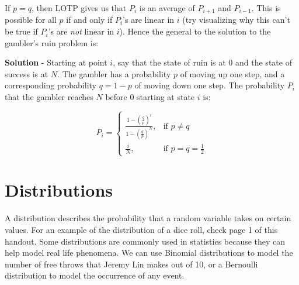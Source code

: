 \documentclass[11pt]{article}
\theoremstyle{definition}
\theoremstyle{remark}
\begin{document}
If $p = q$, then LOTP gives us that $P_i$ is an average of $P_{i+1}$ and $P_{i-1}$. This is possible for all $p$ if and only if $P_i$'s are linear in $i$ (try visualizing why this can't be true if $P_i$'s are \textit{not} linear in $i$). Hence the general to the solution to the gambler's ruin problem is:

\textbf{Solution} - Starting at point $i$, say that the state of ruin is at $0$ and the state of success is at $N$. The gambler has a probability $p$ of moving up one step, and a corresponding probability $q = 1-p$ of moving down one step. The probability $P_i$ that the gambler reaches $N$ before $0$ starting at state $i$ is:

$$P_i =
\begin{cases}
\frac{1 - \left(\frac{q}{p}\right)^i}{1 - \left(\frac{q}{p}\right)^N}, & \text{if }p \neq q \\
\frac{i}{N}, & \text{if } p = q = \frac{1}{2}
\end{cases}$$


\section{Distributions}

A distribution describes the probability that a random variable takes on certain values. For an example of the distribution of a dice roll, check page 1 of this handout. Some distributions are commonly used in statistics because they can help model real life phenomena. We can use Binomial distributions to model the number of free throws that Jeremy Lin makes out of 10, or a Bernoulli distribution to model the occurrence of any event.
\end{document}
